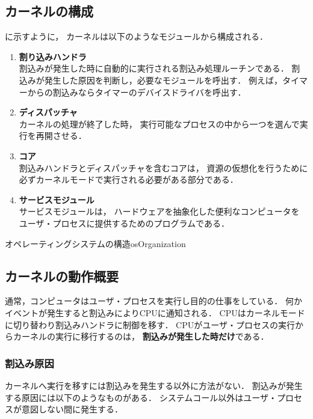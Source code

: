 \subsection{カーネルの構成}
に示すように，
カーネルは以下のようなモジュールから構成される．

\begin{enumerate}
\item {\bf 割り込みハンドラ} \\
割込みが発生した時に自動的に実行される割込み処理ルーチンである．
割込みが発生した原因を判断し，必要なモジュールを呼出す．
例えば，タイマーからの割込みならタイマーのデバイスドライバを呼出す．

\item {\bf ディスパッチャ} \\
カーネルの処理が終了した時，
実行可能なプロセスの中から一つを選んで実行を再開させる．

\item {\bf コア} \\
割込みハンドラとディスパッチャを含むコアは，
資源の仮想化を行うために必ずカーネルモードで実行される必要がある部分である．

\item {\bf サービスモジュール} \\
サービスモジュールは，
ハードウェアを抽象化した便利なコンピュータを
ユーザ・プロセスに提供するためのプログラムである．
\end{enumerate}

{オペレーティングシステムの構造}{osOrganization}

\subsection{カーネルの動作概要}
通常，コンピュータはユーザ・プロセスを実行し目的の仕事をしている．
何かイベントが発生すると割込みによりCPUに通知される．
CPUはカーネルモードに切り替わり割込みハンドラに制御を移す．
CPUがユーザ・プロセスの実行からカーネルの実行に移行するのは，
{\bf 割込みが発生した時だけ}である．

\subsubsection{割込み原因}
\label{interruptSource}
カーネルへ実行を移すには割込みを発生する以外に方法がない．
割込みが発生する原因には以下のようなものがある．
システムコール以外はユーザ・プロセスが意図しない間に発生する．

